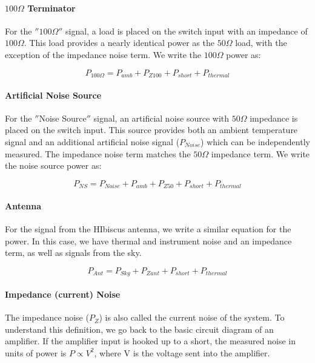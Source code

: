 \paragraph{$100 \Omega$ Terminator}

For the $'' 100 \Omega ''$ signal, a load is placed on the switch input with an impedance of $100 \Omega$. This load provides a nearly identical power as the $50 \Omega$ load, with the exception of the impedance noise term. We write the $100 \Omega$ power as:

\begin{equation}
P_{100 \Omega} = P_{amb}+P_{Z100}+P_{short}+P_{thermal}
\end{equation}

\paragraph{Artificial Noise Source}

For the $''$Noise Source$''$ signal, an artificial noise source with $50 \Omega$ impedance is placed on the switch input. This source provides both an ambient temperature signal and an additional artificial noise signal ($P_{Noise}$) which can be independently measured. The impedance noise term matches the $50 \Omega$ impedance term. We write the noise source power as:

\begin{equation}
P_{NS} = P_{Noise} + P_{amb}+P_{Z50}+P_{short} +P_{thermal}
\end{equation}


\paragraph{Antenna}

For the signal from the HIbiscus antenna, we write a similar equation for the power. In this case, we have thermal and instrument noise and an impedance term, as well as signals from the sky. 

\begin{equation}\label{Eq:T_ant}
P_{Ant} = P_{Sky}+P_{Zant}+P_{short} + P_{thermal}
\end{equation}

\paragraph{Impedance (current) Noise} 

The impedance noise ($P_Z$) is also called the current noise of the system. To understand this definition, we go back to the basic circuit diagram of an amplifier. If the amplifier input is hooked up to a short, the measured noise in units of power is $P \propto V^2$, where V is the voltage sent into the amplifier. 

